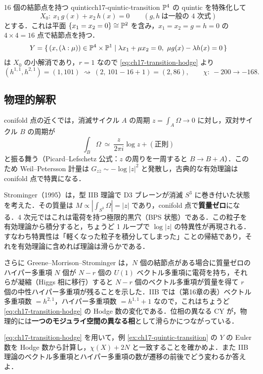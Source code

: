 \begin{myex}{16 個の結節点を持つ quintic}{ch17-quintic-transition}
$\mathbb{P}^4$ の quintic を特殊化して
\[
X_0:\ x_1\,g(x)+x_2\,h(x)=0\qquad(g,h\ \text{は一般の 4 次式})
\]
とする．これは平面 $\{x_1=x_2=0\}\cong\mathbb{P}^2$ を含み，$x_1=x_2=g=h=0$ の $4\times4=16$ 点で結節点を持つ．
\[
Y=\{\,(x,(\lambda:\mu))\in\mathbb{P}^4\times\mathbb{P}^1\mid \lambda x_1+\mu x_2=0,\ \mu g(x)-\lambda h(x)=0\,\}
\]
は $X_0$ の小解消であり，$r=1$ なので \eqref{eq:ch17-transition-hodge} より
\[
(h^{1,1},h^{2,1})=(1,101)\ \rightsquigarrow\ (2,\,101-16+1)=(2,86),\qquad \chi:\ -200\to-168 .
\]
\end{myex}

\subsection{物理的解釈}

\begin{physbox}
conifold 点の近くでは，消滅サイクル $A$ の周期 $z=\int_A\Omega\to0$ に対し，双対サイクル $B$ の周期が
\[
\int_B\Omega\ \simeq\ \frac{z}{2\pi i}\log z+(\text{正則})
\]
と振る舞う（Picard--Lefschetz 公式：$z$ の周りを一周すると $B\to B+A$）．このため Weil--Petersson 計量は $G_{z\bar z}\sim-\log|z|^2$ と発散し，古典的な有効理論は conifold 点で特異になる．

Strominger（1995）は，型 IIB 理論で D3 ブレーンが消滅 $S^3$ に巻き付いた状態を考えた．その質量は $M\propto|\int_{S^3}\Omega|=|z|$ であり，conifold 点で\textbf{質量ゼロ}になる．4 次元ではこれは電荷を持つ極限的黒穴（BPS 状態）である．この粒子を有効理論から積分すると，ちょうど 1 ループで $\log|z|$ の特異性が再現される．すなわち特異性は「軽くなった粒子を積分してしまった」ことの帰結であり，それを有効理論に含めれば理論は滑らかである．

さらに Greene--Morrison--Strominger は，$N$ 個の結節点がある場合に質量ゼロのハイパー多重項 $N$ 個が $N-r$ 個の $U(1)$ ベクトル多重項に電荷を持ち，それらが凝縮（Higgs 相に移行）すると $N-r$ 個のベクトル多重項が質量を得て $r$ 個の中性ハイパー多重項が残ることを示した．IIB では（第16章の表）ベクトル多重項数 $=h^{2,1}$，ハイパー多重項数 $=h^{1,1}+1$ なので，これはちょうど \eqref{eq:ch17-transition-hodge} の Hodge 数の変化である．位相の異なる CY が，物理的には\textbf{一つのモジュライ空間の異なる相}として滑らかにつながっている．
\end{physbox}

\eqref{eq:ch17-transition-hodge} を用いて，例 \ref{ex:ch17-quintic-transition} の $Y$ の Euler 数を Hodge 数から計算し，$\chi(X)+2N$ と一致することを確かめよ．また IIB 理論のベクトル多重項とハイパー多重項の数が遷移の前後でどう変わるか答えよ．

